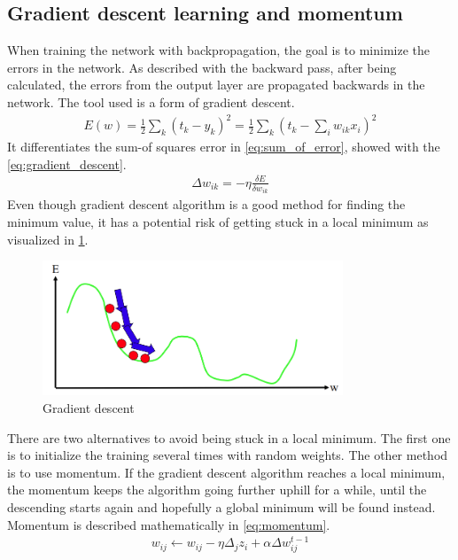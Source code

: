 \documentclass[USenglish]{ifimaster}  %
\begin{document}
\subsection{Gradient descent learning and momentum}
When training the network with backpropagation, the goal is to minimize the errors in the network. As described with the backward pass, after being calculated, the errors from the output layer are propagated backwards in the network. The tool used is a form of gradient descent. 
\begin{equation}\label{eq:sum_of_error}
\begin{aligned}
E(w) = \frac{1}{2} \sum_{k}(t_k - y_k)^2 = \frac{1}{2}\sum_{k}(t_k - \sum_{i} w_{ik}x_i)^2
\end{aligned}
\end{equation}
It differentiates the sum-of squares error in \cref{eq:sum_of_error}, showed with the \cref{eq:gradient_descent}.
\begin{equation}\label{eq:gradient_descent}
\begin{aligned}
\Delta w_{ik} = -\eta\frac{\delta E}{\delta w_{ik}}
\end{aligned}
\end{equation}
Even though gradient descent algorithm is a good method for finding the minimum value, it has a potential risk of getting stuck in a local minimum as visualized in \cref{fig:gradient_descent}.
\begin{figure}[ht]
    \centering
    \includegraphics[width=0.8\textwidth]{bilder/gradient_descent.png}
    \caption{Gradient descent \cite{website:inf_4490_mlp}}
    \label{fig:gradient_descent}
\end{figure}
There are two alternatives to avoid being stuck in a local minimum. The first one is to initialize the training several times with random weights. The other method is to use momentum. If the gradient descent algorithm reaches a local minimum, the momentum keeps the algorithm going further uphill for a while, until the descending starts again and hopefully a global minimum will be found instead. Momentum is described mathematically in \cref{eq:momentum}. 
\begin{equation}\label{eq:momentum}
\begin{aligned}
w_{ij} \longleftarrow w_{ij} - \eta\Delta_j z_i+\alpha\Delta w^{t-1}_{ij}
\end{aligned}
\end{equation}
\end{document}
